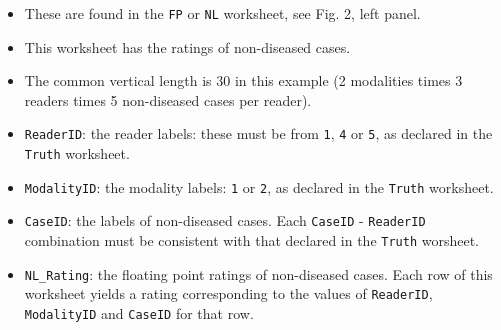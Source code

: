 \documentclass[
]{book}
\providecommand{\tightlist}{%
  \setlength{\itemsep}{0pt}\setlength{\parskip}{0pt}}
\begin{document}
\begin{itemize}
\tightlist
\item
  These are found in the \texttt{FP} or \texttt{NL} worksheet, see Fig. 2, left panel.
\item
  This worksheet has the ratings of non-diseased cases.
\item
  The common vertical length is 30 in this example (2 modalities times 3 readers times 5 non-diseased cases per reader).
\item
  \texttt{ReaderID}: the reader labels: these must be from \texttt{1}, \texttt{4} or \texttt{5}, as declared in the \texttt{Truth} worksheet.
\item
  \texttt{ModalityID}: the modality labels: \texttt{1} or \texttt{2}, as declared in the \texttt{Truth} worksheet.
\item
  \texttt{CaseID}: the labels of non-diseased cases. Each \texttt{CaseID} - \texttt{ReaderID} combination must be consistent with that declared in the \texttt{Truth} worsheet.\\
\item
  \texttt{NL\_Rating}: the floating point ratings of non-diseased cases. Each row of this worksheet yields a rating corresponding to the values of \texttt{ReaderID}, \texttt{ModalityID} and \texttt{CaseID} for that row.
\end{itemize}
\end{document}
